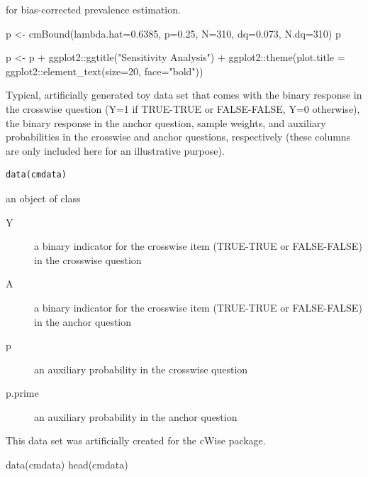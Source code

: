 \documentclass[a4paper]{book}
\begin{document}
%
\begin{SeeAlso}
[bc\_est()] for bias-corrected prevalence estimation.
\end{SeeAlso}
%
\begin{Examples}
\begin{ExampleCode}
p <- cmBound(lambda.hat=0.6385, p=0.25, N=310, dq=0.073, N.dq=310)
p

p <- p + ggplot2::ggtitle("Sensitivity Analysis") +
         ggplot2::theme(plot.title = ggplot2::element_text(size=20, face="bold"))
\end{ExampleCode}
\end{Examples}
%
\begin{Description}
Typical, artificially generated toy data set that comes with the binary response in the crosswise question (Y=1 if TRUE-TRUE or FALSE-FALSE, Y=0 otherwise),
the binary response in the anchor question, sample weights, and auxiliary probabilities in the crosswise and anchor questions, respectively (these columns are only included here for an illustrative purpose).
\end{Description}
%
\begin{Usage}
\begin{verbatim}
data(cmdata)
\end{verbatim}
\end{Usage}
%
\begin{Format}
an object of class 
\begin{description}

\item[Y] a binary indicator for the crosswise item (TRUE-TRUE or FALSE-FALSE) in the crosswise question
\item[A] a binary indicator for the crosswise item (TRUE-TRUE or FALSE-FALSE) in the anchor question
\item[p] an auxiliary probability in the crosswise question
\item[p.prime] an auxiliary probability in the anchor question

\end{description}

\end{Format}
%
\begin{References}
This data set was artificially created for the cWise package.
\end{References}
%
\begin{Examples}
\begin{ExampleCode}

data(cmdata)
head(cmdata)

\end{ExampleCode}
\end{Examples}
\end{document}
